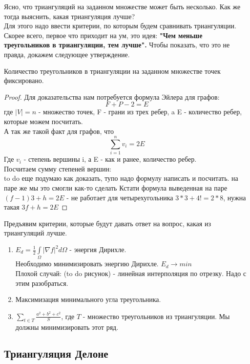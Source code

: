 Ясно, что триангуляций на заданном множестве может быть несколько. Как же тогда выяснить, какая триангуляция лучше? \\
Для этого надо ввести критерии, по которым будем сравнивать триангуляции. Скорее всего, первое что приходит на ум, это идея: 
{\bf "Чем меньше треугольников в триангуляции, тем лучше".} Чтобы показать, что это не правда, докажем следующее утверждение.

\begin{statement}
Количество треугольников в триангуляции на заданном множестве точек фиксировано. 
\begin{proof} 
Для доказательства нам потребуется формула Эйлера для графов:
$$
F + P - 2 = E 
$$
где $|V| = n$ - множество точек, F - грани из трех ребер, a E - количество ребер, которые можем посчитать. \\
А так же такой факт для графов, что 
$$
\sum_{i=1}^{n}v_i = 2E
$$
Где $v_i$ - степень вершины i, а E - как и ранее, количество ребер.\\
Посчитаем сумму степеней вершин: \\
to do еще подумаю как доказать, тупо надо формулу написать и посчитать. на паре же мы это смогли как-то сделать
Кстати формула выведенная на паре$(f-1)3 + h = 2E$ - не работает для четырехугольника $3*3 + 4 != 2*8$, нужна такая $3f+h = 2E$
\end{proof}
\end{statement}

Предъявим критерии, которые будут давать ответ на вопрос, какая из триангуляций лучше.

\begin{enumerate}
	\item $E_{d} = \frac{1}{2}\int\limits_{\Omega}|\nabla f|^2d\Omega$ - энергия Дирихле. \\
		Необходимо минимизировать энергию Дирихле. $E_{d}\rightarrow min$ \\
		Плохой случай: (to do рисунок) - линейная интерполяция по отрезку. Надо с этим разобраться.
	\item Максимизация минимального угла треугольника.
	\item $\sum_{t \in T}^{} \frac{a^2+b^2+c^2}{S}$, где $T$ - множество треугольников из триангуляции.
		Мы должны минимизировать этот ряд. 
\end{enumerate}

\subsection[title]{Триангуляция Делоне}
